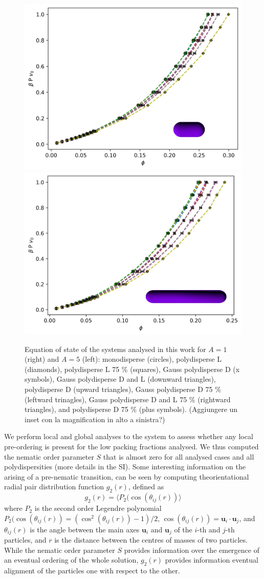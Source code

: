\documentclass[journal=jacsat,manuscript=article]{achemso}
\begin{document}
\begin{figure}[!h]
    \centering
    \includegraphics[width=0.45 \columnwidth]{Figures/EOS_A1.png}
    \includegraphics[width=0.45 \columnwidth]{Figures/EOS_A5.png}
    \caption{Equation of state of the systems analysed in this work for $A = 1$ (right) and $A = 5$ (left): monodisperse (circles), polydisperse L (diamonds), polydisperse L 75 \% (squares), Gauss polydisperse D (x symbols), Gauss polydisperse D and L (downward triangles), polydisperse D (upward triangles), Gauss polydisperse D 75 \% (leftward trinagles), Gauss polydisperse D and L 75 \% (rightward triangles), and polydisperse D 75 \% (plus symbols).  (Aggiungere un inset con la magnification in alto a sinistra?)}
    \label{fig:EOS_HSC_comparison}
\end{figure}
We perform local and global analyses to the system to assess whether any local pre-ordering is present for the low packing fractions analysed. We thus computed the nematic order parameter $S$ that is almost zero for all analysed cases and all polydispersities (more details in the SI). Some interesting information on the arising of a pre-nematic transition, can be seen by computing theorientational radial pair distribution function $g_2(r)$, defined as  
\begin{equation}
g_2(r) = \langle P_2 (\cos(\theta_{ij}(r))\rangle
\end{equation}
where $P_2$ is the second order Legendre polynomial $P_2 (\cos(\theta_{ij}(r)) = (\cos^2(\theta_{ij}(r)) - 1)/2$, $\cos(\theta_{ij}(r)) = \boldsymbol{u}_i \cdot \boldsymbol{u}_j$,  and $\theta_{ij}(r)$ is the angle between the main axes  $\boldsymbol{u}_i$ and $\boldsymbol{u}_j$ of the $i$-th and $j$-th particles, and  $r$ is the distance between the  centres of masses of two particles. 
While the nematic order parameter $S$ provides information over the emergence of an eventual ordering of the whole solution,  $g_2(r)$ provides information eventual alignment of the particles one with respect to the other. 
\end{document}
